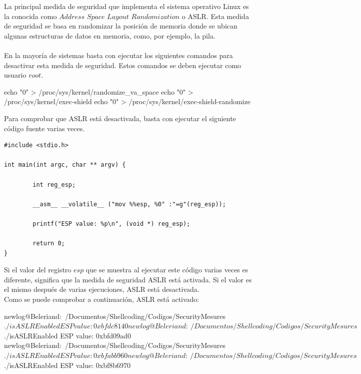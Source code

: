 \documentclass [titlepage, 12pt]{article}
\begin{document}
La principal medida de seguridad que implementa el sistema operativo Linux es la conocida como $Address$ $Space$ $Layout$ $Randomization$ o ASLR. Esta medida de seguridad se basa en randomizar la posici\'on de memoria donde se ubican algunas estructuras de datos en memoria, como, por ejemplo, la pila.\\
\\
En la mayor\'ia de sistemas basta con ejecutar los siguientes comandos para desactivar esta medida de seguridad. Estos comandos se deben ejecutar como usuario $root$.

\begin{listing}[style=consola, numbers=none, caption=Desactivando medidas de seguridad]
echo "0" > /proc/sys/kernel/randomize_va_space
echo "0" > /proc/sys/kernel/exec-shield
echo "0" > /proc/sys/kernel/exec-shield-randomize
\end{listing}

Para comprobar que ASLR est\'a desactivada, basta con ejecutar el siguiente c\'odigo fuente varias veces.

\lstset{language=C++,caption=Comprobando ASLR}
\begin{lstlisting}
#include <stdio.h>

int main(int argc, char ** argv) {

        int reg_esp;

        __asm__ __volatile__ ("mov %%esp, %0" :"=g"(reg_esp));

        printf("ESP value: %p\n", (void *) reg_esp);

        return 0;
}
\end{lstlisting}

Si el valor del registro $esp$ que se muestra al ejecutar este c\'odigo varias veces es diferente, significa que la medida de seguridad ASLR est\'a activada. Si el valor es el mismo despu\'es de varias ejecuciones, ASLR est\'a desactivada.
\\
Como se puede comprobar a continuaci\'on, ASLR est\'a activado:

\begin{listing}[style=consola, numbers=none, caption=ASLR activado]
newlog@Beleriand:~/Documentos/Shellcoding/Codigos/SecurityMesures$ ./isASLREnabled ESP value: 0xbfdc8140
newlog@Beleriand:~/Documentos/Shellcoding/Codigos/SecurityMesures$ ./isASLREnabled 
ESP value: 0xbfd09ad0
newlog@Beleriand:~/Documentos/Shellcoding/Codigos/SecurityMesures$ ./isASLREnabled 
ESP value: 0xbfabb960
newlog@Beleriand:~/Documentos/Shellcoding/Codigos/SecurityMesures$ ./isASLREnabled 
ESP value: 0xbf8b6970
\end{listing}
\end{document}
